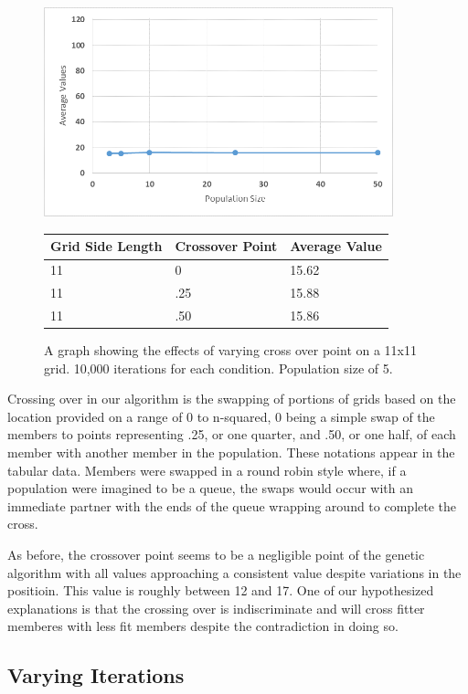 \documentclass[12pt]{article}
\begin{document}
\begin{figure}[H]
    \centering
    \includegraphics[width=0.9\textwidth]{11x11_GA_pop}
\begin{tabular}{ |p{4cm}||p{4cm}|p{4cm}|  }
 \hline
Grid Side Length&Crossover Point&Average Value\\
 \hline
11&0&15.62\\
11&.25&15.88\\
11&.50&15.86\\
 \hline
\end{tabular}
    \caption{A graph showing the effects of varying cross over point on a 11x11 grid. 10,000 iterations for each condition. Population size of 5.}
    \label{fig:GAcross11x11}
\end{figure}

Crossing over in our algorithm is the swapping of portions of grids based on the location provided on a range of 0 to n-squared, 0 being a simple swap of the members to points representing .25, or one quarter, and .50, or one half, of each member with another member in the population. These notations appear in the tabular data. Members were swapped in a round robin style where, if a population were imagined to be a queue, the swaps would occur with an immediate partner with the ends of the queue wrapping around to complete the cross. \newline

As before, the crossover point seems to be a negligible point of the genetic algorithm with all values approaching a consistent value despite variations in the positioin. This value is roughly between 12 and 17. One of our hypothesized explanations is that the crossing over is indiscriminate and will cross fitter memberes with less fit members despite the contradiction in doing so.

\subsection{Varying Iterations}
\end{document}
